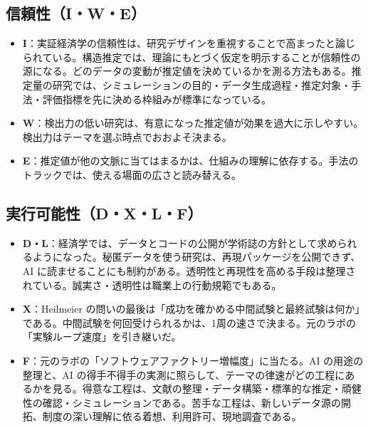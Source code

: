 \documentclass[a4paper,10pt]{ltjsarticle}
\begin{document}
\subsection{信頼性（I・W・E）}

\begin{itemize}[leftmargin=*]
  \item \textbf{I}：実証経済学の信頼性は、研究デザインを重視することで高まったと論じられている\parencite{angrist2010}。構造推定では、理論にもとづく仮定を明示することが信頼性の源になる\parencite{keane2010}。どのデータの変動が推定値を決めているかを測る方法もある\parencite{andrews2017}。推定量の研究では、シミュレーションの目的・データ生成過程・推定対象・手法・評価指標を先に決める枠組みが標準になっている\parencite{morris2019}。
  \item \textbf{W}：検出力の低い研究は、有意になった推定値が効果を過大に示しやすい\parencite{ioannidis2017}。検出力はテーマを選ぶ時点でおおよそ決まる。
  \item \textbf{E}：推定値が他の文脈に当てはまるかは、仕組みの理解に依存する\parencite{deaton2010}。手法のトラックでは、使える場面の広さと読み替える。
\end{itemize}

\subsection{実行可能性（D・X・L・F）}

\begin{itemize}[leftmargin=*]
  \item \textbf{D・L}：経済学では、データとコードの公開が学術誌の方針として求められるようになった\parencite{vilhuber2020,aeadata}。秘匿データを使う研究は、再現パッケージを公開できず、AI に読ませることにも制約がある。透明性と再現性を高める手段は整理されている\parencite{christensen2018}。誠実さ・透明性は職業上の行動規範でもある\parencite{aeacode}。
  \item \textbf{X}：Heilmeier の問いの最後は「成功を確かめる中間試験と最終試験は何か」である\parencite{heilmeier}。中間試験を何回受けられるかは、1周の速さで決まる。元のラボの「実験ループ速度」を引き継いだ\parencite{indxlab}。
  \item \textbf{F}：元のラボの「ソフトウェアファクトリー増幅度」に当たる\parencite{indxlab}。AI の用途の整理\parencite{korinek2023}と、AI の得手不得手の実測\parencite{li2026}に照らして、テーマの律速がどの工程にあるかを見る。得意な工程は、文献の整理・データ構築・標準的な推定・頑健性の確認・シミュレーションである。苦手な工程は、新しいデータ源の開拓、制度の深い理解に依る着想、利用許可、現地調査である。
\end{itemize}
\end{document}
